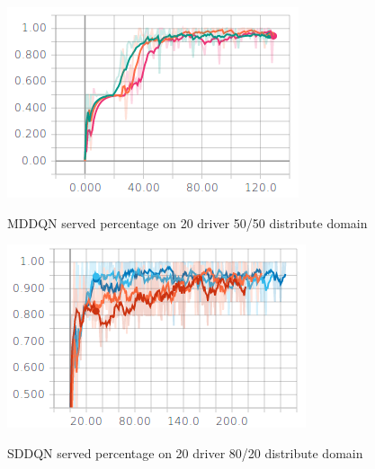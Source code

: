 \begin{figure}[H]
\begin{floatrow}
\centering
\includegraphics[width=1.0\linewidth]{sections/mddqn/figures/MDDQN_bal.png}\label{fig:balancedMD}

\caption{MDDQN served percentage on 20 driver 50/50 distribute domain}
\end{floatrow}
\end{figure}


\begin{figure}[H]
\begin{floatrow}
\centering
\includegraphics[width=1.0\linewidth]{sections/mddqn/figures/SDDQN_imbal.png}\label{fig:imbalancedSD}

\caption{SDDQN served percentage on 20 driver 80/20 distribute domain}
\end{floatrow}
\end{figure}


